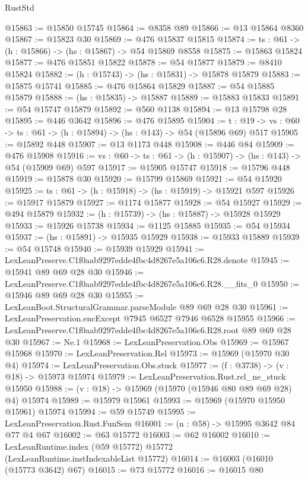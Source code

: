 \begin{lexlean}{RustStd}
\begin{coremodule}
@15863 := @15850 @15745
@15864 := @8358 @89
@15866 := @13 @15864 @8360
@15867 := @15823 @30
@15869 := @476 @15837 @15815
@15874 := {ts : @61} -> (h : @15866) -> (hs : @15867) -> @54 @15869 @8558
@15875 := @15863 @15824
@15877 := @476 @15851 @15822
@15878 := @54 @15877
@15879 := @8410 @15824
@15882 := (h : @15743) -> (hs : @15831) -> @15878 @15879
@15883 := @15875 @15741
@15885 := @476 @15864 @15829
@15887 := @54 @15885 @15879
@15888 := (hs : @15835) -> @15887
@15889 := @15883 @15833
@15891 := @54 @15747 @15879
@15892 := @560 @1138
@15894 := @13 @15798 @28
@15895 := @446 @3642
@15896 := @476 @15895
@15904 := {t : @19} ->
  {vs : @60} -> {ts : @61} -> (h : @15894) -> (hs : @143) -> @54 (@15896 @69) @517
@15905 := @15892 @448
@15907 := @13 @1173 @448
@15908 := @446 @84
@15909 := @476 @15908
@15916 := {vs : @60} -> {ts : @61} -> (h : @15907) -> (hs : @143) -> @54 (@15909 @69) @597
@15917 := @15905 @15747
@15918 := @15796 @448
@15919 := @15878 @30
@15920 := @15799 @15869
@15921 := @54 @15920
@15925 := {ts : @61} -> (h : @15918) -> (hs : @15919) -> @15921 @597
@15926 := @15917 @15879
@15927 := @1174 @15877
@15928 := @54 @15927
@15929 := @494 @15879
@15932 := (h : @15739) -> (hs : @15887) -> @15928 @15929
@15933 := @15926 @15738
@15934 := @1125 @15885
@15935 := @54 @15934
@15937 := (hs : @15891) -> @15935 @15929
@15938 := @15933 @15889
@15939 := @54 @15748
@15940 := @15939 @15929
@15941 := LexLeanPreserve.C1f0aab9297edde4fbc4d8267e5a106c6.R28.denote
@15945 := @15941 @89 @69 @28 @30
@15946 := LexLeanPreserve.C1f0aab9297edde4fbc4d8267e5a106c6.R28.__fits_0
@15950 := @15946 @89 @69 @28 @30
@15955 := LexLeanBoot.StructuralGrammar.parseModule @89 @69 @28 @30
@15961 := LexLeanPreservation.encExcept @7945 @6527 @7946 @6528 @15955
@15966 := LexLeanPreserve.C1f0aab9297edde4fbc4d8267e5a106c6.R28.root @89 @69 @28 @30
@15967 := Ne.{1}
@15968 := LexLeanPreservation.Obs
@15969 := @15967 @15968
@15970 := LexLeanPreservation.Rel
@15973 := @15969 (@15970 @30 @4)
@15974 := LexLeanPreservation.Obs.stuck
@15977 := (f : @3738) -> (v : @18) -> @15973 @15974
@15979 := LexLeanPreservation.Rust.rel_ne_stuck @15950
@15988 := (v : @18) -> @15969 (@15970 (@15946 @80 @89 @69 @28) @4) @15974
@15989 := @15979 @15961
@15993 := @15969 (@15970 @15950 @15961) @15974
@15994 := @59 @15749
@15995 := LexLeanPreservation.Rust.FunSem
@16001 := (n : @58) -> @15995 @3642 @84 @77 @4 @67
@16002 := @63 @15772
@16003 := @62 @16002
@16010 := LexLeanRuntime.index (@59 @15772) @15772 (LexLeanRuntime.instIndexableList @15772)
@16014 := @16003 (@16010 (@15773 @3642) @67)
@16015 := @73 @15772
@16016 := @16015 @80

\end{coremodule}
\end{lexlean}

